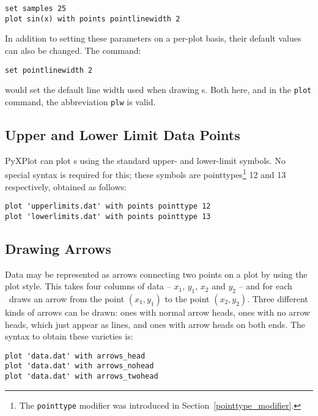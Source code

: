 \begin{verbatim}
set samples 25
plot sin(x) with points pointlinewidth 2
\end{verbatim}

\noindent In addition to setting these parameters on a per-plot basis, their
default values can also be changed. The command:

\begin{verbatim}
set pointlinewidth 2
\end{verbatim}

\noindent would set the default line width used when drawing \datapoint s. Both
here, and in the {\tt plot} command, the abbreviation {\tt plw} is valid. 

\subsection{Upper and Lower Limit Data Points}

PyXPlot can plot \datapoint s using the standard upper- and lower-limit
symbols. No special
syntax is required for this; these symbols are pointtypes\footnote{The
{\tt pointtype} modifier was introduced in
Section~\ref{pointtype_modifier}.} 12 and 13 respectively, obtained as follows:

\begin{verbatim}
plot 'upperlimits.dat' with points pointtype 12
plot 'lowerlimits.dat' with points pointtype 13
\end{verbatim}

\subsection{Drawing Arrows}
\label{arrows_plot_style} 

Data may be represented as arrows connecting two points on a plot by using the
 plot style.  This takes four columns of data -- $x_1$, $y_1$,
$x_2$ and $y_2$ -- and for each \datapoint\ draws an arrow from the point
$(x_1,y_1)$ to the point $(x_2,y_2)$.  Three different kinds of arrows can be
drawn: ones with normal arrow heads, ones with no arrow heads, which just
appear as lines, and ones with arrow heads on both ends. The syntax to obtain
these varieties is:

\begin{verbatim}
plot 'data.dat' with arrows_head
plot 'data.dat' with arrows_nohead
plot 'data.dat' with arrows_twohead
\end{verbatim}

